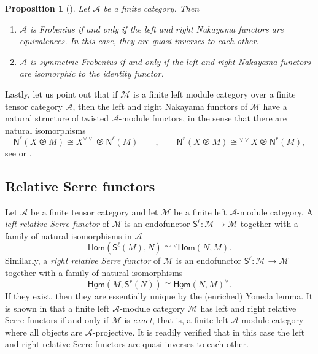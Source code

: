 \documentclass[11pt]{article}
\newtheorem{proposition}[theorem]{Proposition}
\theoremstyle{definition}
\begin{document}
\begin{proposition}[{\cite[Proposition 3.24]{fss}}]
Let $\mathcal{A}$ be a finite category. Then
\begin{enumerate}
\item $\mathcal{A}$ is Frobenius if and only if the left and right Nakayama functors are equivalences. In this case, they are quasi-inverses to each other.
\item $\mathcal{A}$ is symmetric Frobenius if and only if the left and right Nakayama functors are isomorphic to the identity functor. 
\end{enumerate}
\end{proposition}


Lastly, let us point out that if $\mathcal{M}$ is a finite left module category over a finite tensor category $\mathcal{A}$, then the left and right Nakayama functors of $\mathcal{M}$ have a natural structure of twisted $\mathcal{A}$-module functors, in the sense that there are natural isomorphisms 
\begin{equation}\label{eq:Nakayama_twisted}
\mathsf{N}^\ell(X \ogreaterthan M) \cong  X^{\vee \vee} 	\ogreaterthan  \mathsf{N}^\ell( M) \qquad , \qquad \mathsf{N}^r(X \ogreaterthan M) \cong  {}^{\vee \vee} X	\ogreaterthan  \mathsf{N}^r( M),
\end{equation}
see \cite[Theorem 4.4]{fss} or \cite[\S 2.5]{relserre}.



\subsection{Relative Serre functors}


Let $\mathcal{A}$ be a finite tensor category and let $\mathcal{M}$ be a finite left $\mathcal{A}$-module category. A \emph{left relative Serre functor} of $\mathcal{M}$ is an endofunctor $\mathsf{S}^\ell : \mathcal{M} \longrightarrow \mathcal{M}$ together with a family of natural isomorphisms in $\mathcal{A}$ 
\begin{equation}\label{eq:left_Serre_natiso}
\underline{\mathsf{Hom}} (\mathsf{S}^\ell(M),N) \cong {}^\vee \underline{\mathsf{Hom}}(N,M). 
\end{equation}
Similarly, 
a \emph{right relative Serre functor} of $\mathcal{M}$ is an endofunctor $\mathsf{S}^\ell : \mathcal{M} \longrightarrow \mathcal{M}$ together with a family of natural isomorphisms
\begin{equation}\label{eq:right_Serre_natiso}
 \underline{\mathsf{Hom}} (M,\mathsf{S}^r(N)) \cong \underline{\mathsf{Hom}}(N,M)^\vee . 
\end{equation}
If they exist, then they are essentially unique by the (enriched) Yoneda lemma. It is shown in \cite[Proposition 4.24]{fss} that a finite left $\mathcal{A}$-module category $\mathcal{M}$ has left and right relative Serre functors if and only if $\mathcal{M}$ is \emph{exact}, that is, a finite left $\mathcal{A}$-module category where all objects  are $\mathcal{A}$-projective. It is readily verified that in this case the left and right relative Serre functors are quasi-inverses to each other.
\end{document}
